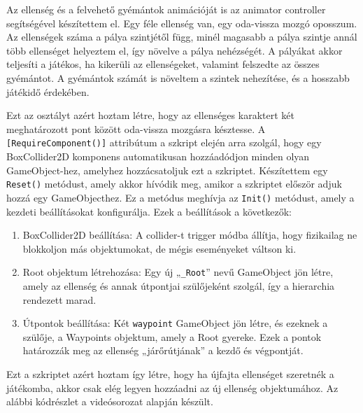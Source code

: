 \newpage
{}

Az ellenség és a felvehető gyémántok animációját is az animator controller segítségével készítettem el. Egy féle ellenség van, egy oda-vissza mozgó oposszum. Az ellenségek száma a pálya szintjétől függ, minél magasabb a pálya szintje annál több ellenséget helyeztem el, így növelve a pálya nehézségét. A pályákat akkor teljesíti a játékos, ha kikerüli az ellenségeket, valamint felszedte az összes gyémántot. A gyémántok számát is növeltem a szintek nehezítése, és a hosszabb játékidő érdekében.


Ezt az osztályt azért hoztam létre, hogy az ellenséges karaktert két meghatározott pont között oda-vissza mozgásra késztesse. A \texttt{[RequireComponent()]} attribútum a szkript elején arra szolgál, hogy egy BoxCollider2D komponens automatikusan hozzáadódjon minden olyan  GameObject-hez, amelyhez hozzácsatoljuk ezt a szkriptet. Készítettem egy \texttt{Reset()} metódust, amely akkor hívódik meg, amikor a szkriptet először adjuk hozzá egy GameObjecthez. Ez a metódus meghívja az \texttt{Init()} metódust, amely a kezdeti beállításokat konfigurálja. Ezek a beállítások a következők:
\begin{enumerate}
\item BoxCollider2D beállítása: A collider-t trigger módba állítja, hogy fizikailag ne blokkoljon más objektumokat, de mégis eseményeket váltson ki.
\item Root objektum létrehozása: Egy új „\texttt{\_Root}” nevű GameObject jön létre, amely az ellenség és annak útpontjai szülőjeként szolgál, így a hierarchia rendezett marad.
\item Útpontok beállítása: Két \texttt{waypoint} GameObject jön létre, és ezeknek a szülője, a Waypoints objektum, amely a Root gyereke. Ezek a pontok határozzák meg az ellenség „járőrútjának” a kezdő és végpontját.
\end{enumerate}

Ezt a szkriptet azért hoztam így létre, hogy ha újfajta ellenséget szeretnék a játékomba, akkor csak elég legyen hozzáadni az új ellenség objektumához. Az alábbi kódrészlet a \cite{youtubeplaylist} videósorozat alapján készült.

